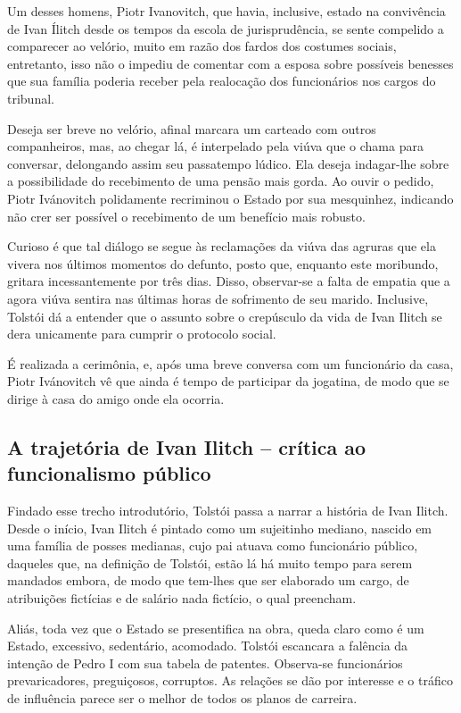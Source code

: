 \documentclass[12pt]{extarticle}
\begin{document}
Um desses homens, Piotr Ivanovitch, que havia, inclusive, estado na
convivência de Ivan Ílitch desde os tempos da escola de jurisprudência,
se sente compelido a comparecer ao velório, muito em razão dos fardos
dos costumes sociais, entretanto, isso não o impediu de comentar com a
esposa sobre possíveis benesses que sua família poderia receber pela
realocação dos funcionários nos cargos do tribunal.

Deseja ser breve no velório, afinal marcara um carteado com outros
companheiros, mas, ao chegar lá, é interpelado pela viúva que o chama
para conversar, delongando assim seu passatempo lúdico. Ela deseja
indagar-lhe sobre a possibilidade do recebimento de uma pensão mais
gorda. Ao ouvir o pedido, Piotr Ivánovitch polidamente recriminou o
Estado por sua mesquinhez, indicando não crer ser possível o recebimento
de um benefício mais robusto.

Curioso é que tal diálogo se segue às reclamações da viúva das agruras
que ela vivera nos últimos momentos do defunto, posto que, enquanto este
moribundo, gritara incessantemente por três dias. Disso, observar-se a
falta de empatia que a agora viúva sentira nas últimas horas de
sofrimento de seu marido. Inclusive, Tolstói dá a entender que o assunto
sobre o crepúsculo da vida de Ivan Ilitch se dera unicamente para
cumprir o protocolo social.

É realizada a cerimônia, e, após uma breve conversa com um funcionário
da casa, Piotr Ivánovitch vê que ainda é tempo de participar da
jogatina, de modo que se dirige à casa do amigo onde ela ocorria.

\subsection{A trajetória de Ivan Ilitch -- crítica ao funcionalismo público}

Findado esse trecho introdutório, Tolstói passa a narrar a história de
Ivan Ilitch. Desde o início, Ivan Ilitch é pintado como um sujeitinho
mediano, nascido em uma família de posses medianas, cujo pai atuava como
funcionário público, daqueles que, na definição de Tolstói, estão lá há
muito tempo para serem mandados embora, de modo que tem-lhes que ser
elaborado um cargo, de atribuições fictícias e de salário nada fictício,
o qual preencham.

Aliás, toda vez que o Estado se presentifica na obra, queda claro como é
um Estado, excessivo, sedentário, acomodado. Tolstói escancara a
falência da intenção de Pedro I com sua tabela de patentes. Observa-se
funcionários prevaricadores, preguiçosos, corruptos. As relações se dão
por interesse e o tráfico de influência parece ser o melhor de todos os
planos de carreira.
\end{document}
